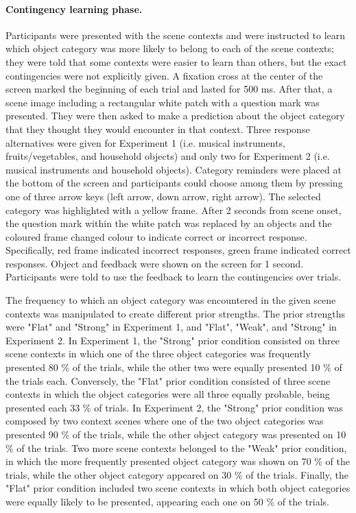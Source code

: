 \documentclass[a4paper,12pt]{article}
\begin{document}
\paragraph{Contingency learning phase.}
Participants were presented with the scene contexts and were instructed to learn which object category was more likely to belong to each of the scene contexts; they were told that some contexts were easier to learn than others, but the exact contingencies were not explicitly given. A fixation cross at the center of the screen marked the beginning of each trial and lasted for 500 ms. After that, a scene image including a rectangular white patch with a question mark was presented. They were then asked to make a prediction about the object category that they thought they would encounter in that context. Three response alternatives were given for Experiment 1 (i.e. musical instruments, fruits/vegetables, and household objects) and only two for Experiment 2 (i.e. musical instruments and household objects). Category reminders were placed at the bottom of the screen and participants could choose among them by pressing one of three arrow keys (left arrow, down arrow, right arrow). The selected category was highlighted with a yellow frame. After 2 seconds from scene onset, the question mark within the white patch was replaced by an objects and the coloured frame changed colour to indicate correct or incorrect response. Specifically, red frame indicated incorrect responses, green frame indicated correct responses. Object and feedback were shown on the screen for 1 second. Participants were told to use the feedback to learn the contingencies over trials. \par
The frequency to which an object category was encountered in the given scene contexts was manipulated to create different prior strengths. The prior strengths were "Flat" and "Strong" in Experiment 1, and "Flat", "Weak", and "Strong" in Experiment 2. In Experiment 1, the "Strong" prior condition consisted on three scene contexts in which one of the three object categories was frequently presented 80 \% of the trials, while the other two were equally presented 10 \% of the trials each. Conversely, the "Flat" prior condition consisted of three scene contexts in which the object categories were all three equally probable, being presented each 33 \% of trials. 
In Experiment 2, the "Strong" prior condition was composed by two context scenes where one of the two object categories was presented 90 \% of the trials, while the other object category was presented on 10 \% of the trials. Two more scene contexts belonged to the "Weak" prior condition, in which the more frequently presented object category was shown on 70 \% of the trials, while the other object category appeared on 30 \% of the trials. Finally, the "Flat" prior condition included two scene contexts in which both object categories were equally likely to be presented, appearing each one on 50 \% of the trials. 
\end{document}
